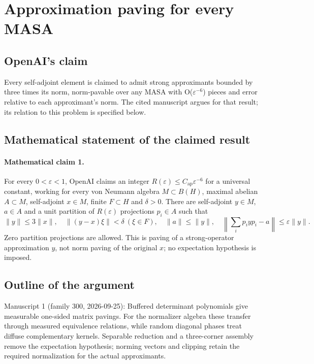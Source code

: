 \documentclass[11pt]{article}
\begin{document}
\section*{Approximation paving for every MASA}

\subsection{OpenAI's claim}
Every self-adjoint element is claimed to admit strong approximants bounded by three times its norm, norm-pavable over any MASA with O(\(\varepsilon^{-6}\)) pieces and error relative to each approximant's norm. The cited manuscript argues for that result; its relation to this problem is specified below.

\subsection{Mathematical statement of the claimed result}
\paragraph{Mathematical claim 1.} For every $0<\varepsilon<1$, OpenAI claims an integer $R(\varepsilon)\le C_{\mathrm{ap}}\varepsilon^{-6}$ for a universal constant, working for every von Neumann algebra $M\subset B(H)$, maximal abelian $A\subset M$, self-adjoint $x\in M$, finite $F\subset H$ and $\delta>0$. There are self-adjoint $y\in M$, $a\in A$ and a unit partition of $R(\varepsilon)$ projections $p_i\in A$ such that
\[
\|y\|\le3\|x\|,\quad\|(y-x)\xi\|<\delta\ (\xi\in F),\quad
\|a\|\le\|y\|,\quad\left\|\sum_ip_iyp_i-a\right\|\le\varepsilon\|y\|.
\]
Zero partition projections are allowed. This is paving of a strong-operator approximation $y$, not norm paving of the original $x$; no expectation hypothesis is imposed.

\subsection{Outline of the argument}
Manuscript 1 (family 300, 2026-09-25): Buffered determinant polynomials give measurable one-sided matrix pavings. For the normalizer algebra these transfer through measured equivalence relations, while random diagonal phases treat diffuse complementary kernels. Separable reduction and a three-corner assembly remove the expectation hypothesis; norming vectors and clipping retain the required normalization for the actual approximants.
\end{document}
